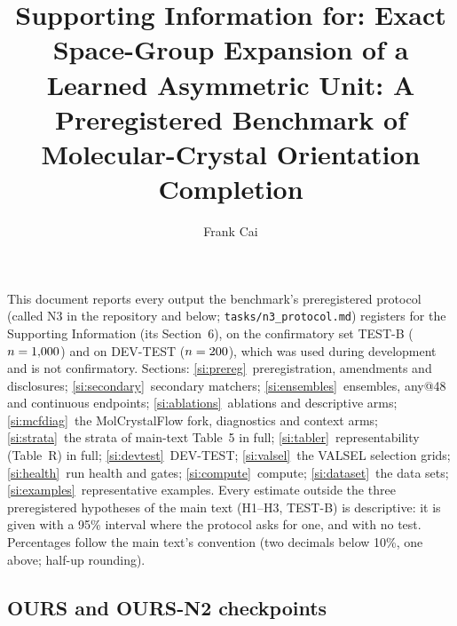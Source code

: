 \documentclass[journal=acsodf,manuscript=article]{achemso}
\author{Frank Cai}
\affiliation{Purdue University, West Lafayette, Indiana 47907, United States}
\title{Supporting Information for: Exact Space-Group Expansion of a Learned Asymmetric Unit:
A Preregistered Benchmark of Molecular-Crystal Orientation Completion}
\begin{document}
\noindent This document reports every output the benchmark's preregistered protocol (called
N3 in the repository and below; \texttt{tasks/n3\_protocol.md}) registers for the Supporting
Information (its Section~6), on the confirmatory set TEST-B ($n=1{,}000$) and on DEV-TEST
($n=200$), which was used during development and is not confirmatory. Sections:
\ref{si:prereg}~preregistration, amendments and disclosures;
\ref{si:secondary}~secondary matchers;
\ref{si:ensembles}~ensembles, any@48 and continuous endpoints;
\ref{si:ablations}~ablations and descriptive arms;
\ref{si:mcfdiag}~the MolCrystalFlow fork, diagnostics and context arms;
\ref{si:strata}~the strata of main-text Table~5 in full;
\ref{si:tabler}~representability (Table~R) in full;
\ref{si:devtest}~DEV-TEST;
\ref{si:valsel}~the VALSEL selection grids;
\ref{si:health}~run health and gates;
\ref{si:compute}~compute;
\ref{si:dataset}~the data sets;
\ref{si:examples}~representative examples.
Every estimate outside the three preregistered hypotheses of the main text (H1--H3, TEST-B) is
descriptive: it is given with a 95\% interval where the protocol asks for one, and with no
test. Percentages follow the main text's convention (two decimals below 10\%, one above;
half-up rounding).



\subsection{OURS and OURS-N2 checkpoints}\label{si:oursckpt}
\end{document}

